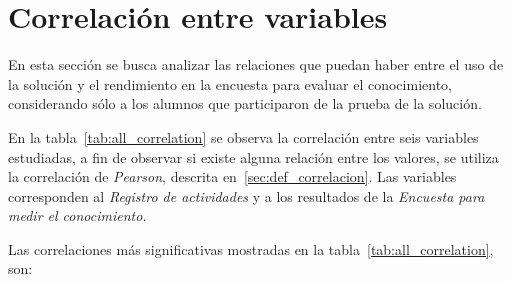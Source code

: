 \section{Correlación entre variables}
\label{sec:correlacion}

En esta sección se busca analizar las relaciones que puedan haber entre 
el uso de la solución y el rendimiento en la encuesta para evaluar el conocimiento, 
considerando sólo a los alumnos que participaron de la prueba de la solución.

En la tabla~\ref{tab:all_correlation} se observa la correlación entre seis
variables estudiadas, a fin de observar si existe alguna relación entre los
valores, se utiliza la correlación de \emph{Pearson}, descrita
en~\ref{sec:def_correlacion}. Las variables corresponden al \emph{Registro de
    actividades} y a los resultados de la \emph{Encuesta para medir el
    conocimiento}.


Las correlaciones  más significativas mostradas en la
tabla~\ref{tab:all_correlation}, son:


